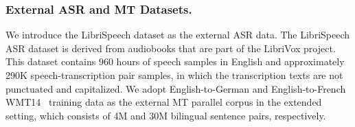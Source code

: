 \documentclass[letterpaper]{article} %
\begin{document}
\begin{table}[t]
    \centering
    \caption{The statistics of 8 translation directions in the MuST-C dataset.}
    \label{tab:must-c_stat}
\end{table}

\subsubsection*{External ASR and MT Datasets.}
We introduce the LibriSpeech dataset \cite{Panayotov2015LibrispeechAA} as the external ASR data. 
The LibriSpeech ASR dataset is derived from audiobooks that are part of the LibriVox project.
This dataset contains 960 hours of speech samples in English and approximately 290K speech-transcription pair samples, in which the transcription texts are not punctuated and capitalized. 
We adopt English-to-German and English-to-French WMT14~\cite{Bojar2014FindingsOT} training data as the external MT parallel corpus in the extended setting, which consists of 4M and 30M bilingual sentence pairs, respectively. 
\end{document}

